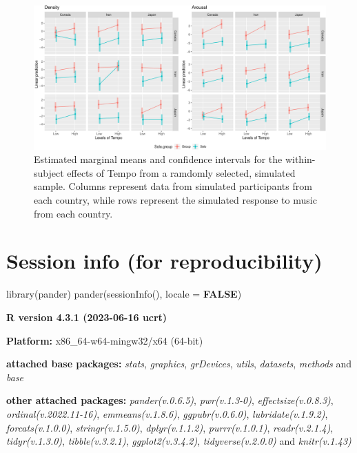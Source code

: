 \documentclass[
  bookmarksnumbered]{article}
\newenvironment{Shaded}{\begin{snugshade}}{\end{snugshade}}
\newcommand{\AttributeTok}[1]{\textcolor[rgb]{0.80,0.80,0.80}{#1}}
\newcommand{\ConstantTok}[1]{\textcolor[rgb]{0.86,0.64,0.64}{\textbf{#1}}}
\newcommand{\FunctionTok}[1]{\textcolor[rgb]{0.94,0.94,0.56}{#1}}
\newcommand{\NormalTok}[1]{\textcolor[rgb]{0.80,0.80,0.80}{#1}}
\begin{document}
\begin{figure}
\centering
\includegraphics{Power_analysis_files/figure-latex/mod-ex-1.pdf}
\caption{\label{fig:mod-ex}Estimated marginal means and confidence intervals for the within-subject effects of Tempo from a ramdomly selected, simulated sample. Columns represent data from simulated participants from each country, while rows represent the simulated response to music from each country.}
\end{figure}

\hypertarget{session}{%
\section{Session info (for reproducibility)}\label{session}}

\begin{Shaded}
\begin{Highlighting}[]
\FunctionTok{library}\NormalTok{(pander)}
\FunctionTok{pander}\NormalTok{(}\FunctionTok{sessionInfo}\NormalTok{(), }\AttributeTok{locale =} \ConstantTok{FALSE}\NormalTok{)}
\end{Highlighting}
\end{Shaded}

\textbf{R version 4.3.1 (2023-06-16 ucrt)}

\textbf{Platform:} x86\_64-w64-mingw32/x64 (64-bit)

\textbf{attached base packages:}
\emph{stats}, \emph{graphics}, \emph{grDevices}, \emph{utils}, \emph{datasets}, \emph{methods} and \emph{base}

\textbf{other attached packages:}
\emph{pander(v.0.6.5)}, \emph{pwr(v.1.3-0)}, \emph{effectsize(v.0.8.3)}, \emph{ordinal(v.2022.11-16)}, \emph{emmeans(v.1.8.6)}, \emph{ggpubr(v.0.6.0)}, \emph{lubridate(v.1.9.2)}, \emph{forcats(v.1.0.0)}, \emph{stringr(v.1.5.0)}, \emph{dplyr(v.1.1.2)}, \emph{purrr(v.1.0.1)}, \emph{readr(v.2.1.4)}, \emph{tidyr(v.1.3.0)}, \emph{tibble(v.3.2.1)}, \emph{ggplot2(v.3.4.2)}, \emph{tidyverse(v.2.0.0)} and \emph{knitr(v.1.43)}
\end{document}
